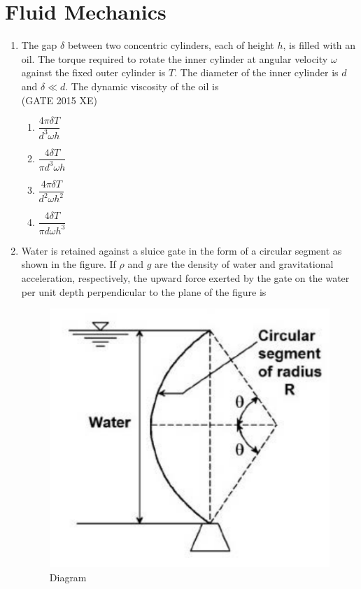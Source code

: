 \documentclass[journal,12pt,onecolumn]{IEEEtran}
\begin{document}
\section*{Fluid Mechanics}
\bigskip
\begin{enumerate}

\item The gap $\delta$ between two concentric cylinders, each of height $h$, is filled with an oil. The torque required to rotate the inner cylinder at angular velocity $\omega$ against the fixed outer cylinder is $T$. The diameter of the inner cylinder is $d$ and $\delta \ll d$. The dynamic viscosity of the oil is \\
\hfill{(GATE 2015 XE)}

\begin{multicols}{4}
\begin{enumerate}
\item $\dfrac{4\pi \delta T}{d^3 \omega h}$
\item $\dfrac{4\delta T}{\pi d^3 \omega h}$
\item $\dfrac{4\pi \delta T}{d^2 \omega h^2}$
\item $\dfrac{4\delta T}{\pi d \omega h^3}$
\end{enumerate}
\end{multicols}

\item Water is retained against a sluice gate in the form of a circular segment as shown in the figure. If $\rho$ and $g$ are the density of water and gravitational acceleration, respectively, the upward force exerted by the gate on the water per unit depth perpendicular to the plane of the figure is  

\begin{figure}[htbp]
  \centering
  \includegraphics[width=.6\columnwidth]{figs/B/fig1.png} 
  \caption{Diagram}
  \label{fig:figs/B/fig1.png}
\end{figure}



\end{enumerate}
\end{document}
